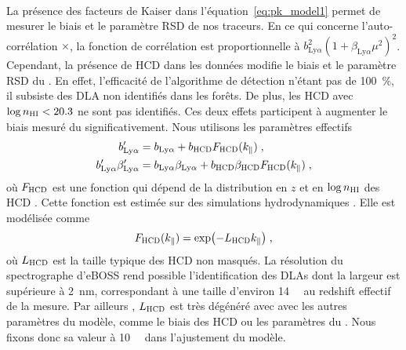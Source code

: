 \documentclass[11pt, twoside, a4paper, openright]{report}
\begin{document}
\paragraph{}
La présence des facteurs de Kaiser dans l'équation~\ref{eq:pk_model1} permet de mesurer le biais et le paramètre RSD de nos traceurs. En ce qui concerne l'auto-corrélation \lya{}$\times$\lya{}, la fonction de corrélation est proportionnelle à $b_{\mathrm{Ly}\alpha}^2(1+\beta_{\mathrm{Ly}\alpha} \mu^2)^2$. Cependant, la présence de HCD dans les données modifie le biais et le paramètre RSD du \lya{}. En effet, l'efficacité de l'algorithme de détection n'étant pas de \SI{100}{\percent}, il subsiste des DLA non identifiés dans les forêts. De plus, les HCD avec $\log n_{\textsc{HI}} < \num{20.3}$ ne sont pas identifiés. Ces deux effets participent à augmenter le biais mesuré du \lya{} significativement. Nous utilisons les paramètres effectifs
\begin{align}
  b_{\mathrm{Ly}\alpha}' &= b_{\mathrm{Ly}\alpha} + b_{\textsc{HCD}} F_{\textsc{HCD}}(k_{\parallel}{}) \; , \\
  b_{\mathrm{Ly}\alpha}' \beta_{\mathrm{Ly}\alpha}' &= b_{\mathrm{Ly}\alpha} \beta_{\mathrm{Ly}\alpha} + b_{\textsc{HCD}} \beta_{\textsc{HCD}} F_{\textsc{HCD}}(k_{\parallel}{})  \; ,
\end{align}
où $F_{\textsc{HCD}}$ est une fonction qui dépend de la distribution en $z$ et en $\log n_{\textsc{HI}}$ des HCD \autocite{Font-Ribera2012a}. Cette fonction est estimée sur des simulations hydrodynamiques \autocite{Rogers2017}. Elle est modélisée comme
\begin{equation}
  F_{\textsc{HCD}}(k_{\parallel}{}) = \exp(- L_{\textsc{HCD}} k_{\parallel}{}) \; ,
\end{equation}
où $L_{\textsc{HCD}}$ est la taille typique des HCD non masqués. La résolution du spectrographe d'eBOSS rend possible l'identification des DLAs dont la largeur est supérieure à \SI{2}{\nano\meter}, correspondant à une taille d'environ \SI{14}{\perh\Mpc} au redshift effectif de la mesure. Par ailleurs , $L_{\textsc{HCD}}$ est très dégénéré avec avec les autres paramètres du modèle, comme le biais des HCD ou les paramètres du \lya{}. Nous fixons donc sa valeur à \SI{10}{\perh\Mpc} dans l'ajustement du modèle.
\end{document}
